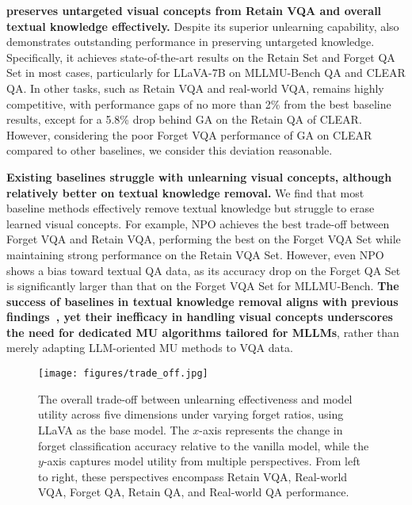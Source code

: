  \textbf{\method preserves untargeted visual concepts from Retain VQA and overall textual knowledge effectively.}
Despite its superior unlearning capability, \method also demonstrates outstanding performance in preserving untargeted knowledge. Specifically, it achieves state-of-the-art results on the Retain Set and Forget QA Set in most cases, particularly for LLaVA-7B on MLLMU-Bench QA and CLEAR QA. In other tasks, such as Retain VQA and real-world VQA, \method remains highly competitive, with performance gaps of no more than 2\% from the best baseline results, except for a 5.8\% drop behind GA on the Retain QA of CLEAR. However, considering the poor Forget VQA performance of GA on CLEAR compared to other baselines, we consider this deviation reasonable.

 \textbf{Existing baselines struggle with unlearning visual concepts, although relatively better on textual knowledge removal.}\label{con:text}
We find that most baseline methods effectively remove textual knowledge but struggle to erase learned visual concepts. For example, NPO achieves the best trade-off between Forget VQA and Retain VQA, performing the best on the Forget VQA Set while maintaining strong performance on the Retain VQA Set. However, even NPO shows a bias toward textual QA data, as its accuracy drop on the Forget QA Set is significantly larger than that on the Forget VQA Set for MLLMU-Bench. \textbf{The success of baselines in textual knowledge removal aligns with previous findings~\cite{liu2024mllmubench}, yet their inefficacy in handling visual concepts underscores the need for dedicated MU algorithms tailored for MLLMs}, rather than merely adapting LLM-oriented MU methods to VQA data.


\begin{figure*}[!t]
\centering
\vspace{-0.1in}
\texttt{[image: figures/trade\_off.jpg]}
\vspace{-0.25in}
\caption{
The overall trade-off between unlearning effectiveness and model utility across five dimensions under varying forget ratios, using LLaVA as the base model. The $x$-axis represents the change in forget classification accuracy relative to the vanilla model, while the $y$-axis captures model utility from multiple perspectives. From left to right, these perspectives encompass Retain VQA, Real-world VQA, Forget QA, Retain QA, and Real-world QA performance.}
\vspace{-0.1in}
\label{fig:trade-off}
\end{figure*}

